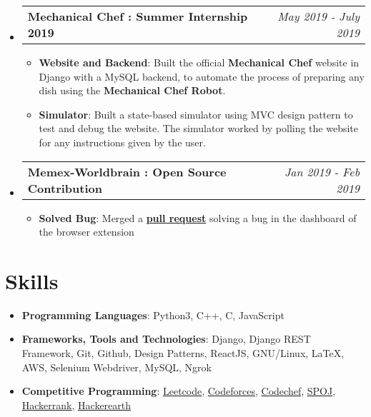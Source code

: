 \documentclass[a4paper,timesnewroman,11pt, twoside]{article}
\makeatletter
\numberwithin{equation}{section}
\newcommand{\resumeItem}[2]{
  \item\small{
    \textbf{#1}{: #2 \vspace{-5pt}}
  }
}
\newcommand{\resumeSubheadingk}[4]{
  \vspace{-3pt}\item
    \begin{tabular*}{0.97\textwidth}[t]{l@{\extracolsep{\fill}}r}
      \textbf{#1}  &\textit{#2} \\
    \end{tabular*}\vspace{-3.1pt}
}
\newcommand{\resumeSubHeadingListStart}{\begin{itemize}[leftmargin=*]}
\newcommand{\resumeSubHeadingListEnd}{\end{itemize}}
\newcommand{\resumeItemListStart}{\begin{itemize}}
\newcommand{\resumeItemListEnd}{\end{itemize}\vspace{-12pt}}
\makeatother
\begin{document}
\resumeSubHeadingListStart
    \resumeSubheadingk
      {Mechanical Chef : Summer Internship 2019}{May 2019 - July 2019}
      {}{}
      \resumeItemListStart
        \resumeItem{Website and Backend}
          {Built the official \textbf{Mechanical Chef} website in Django with a MySQL backend, to automate the process of preparing any dish using the \textbf{Mechanical Chef Robot}.}
        \resumeItem{Simulator}
          {Built a state-based simulator using MVC design pattern to test and debug the website. The simulator worked by polling the website for any instructions given by the user.}
      \resumeItemListEnd
  \resumeSubHeadingListEnd
  \resumeSubHeadingListStart
    \resumeSubheadingk
      {Memex-Worldbrain : Open Source Contribution}{Jan 2019 - Feb 2019}
      {}{}
      \resumeItemListStart
        \resumeItem{Solved Bug}
          {Merged a \href{https://github.com/WorldBrain/Memex/pull/693}{\textbf{pull request}} solving a bug in the dashboard of the browser extension}
      \resumeItemListEnd

  \resumeSubHeadingListEnd


\section{Skills}
 \resumeSubHeadingListStart
   \item{
     \textbf{Programming Languages}{: Python3, C++, C, JavaScript}
   }
   
   \item{
      \textbf{Frameworks, Tools and Technologies}{: Django, Django REST Framework, Git, Github, Design Patterns, ReactJS, GNU/Linux, LaTeX, AWS, Selenium Webdriver, MySQL, Ngrok}
   }
   \item{
      \textbf{Competitive Programming}{: \href{https://www.leetcode.com/saxenakartik}{Leetcode}, \href{http://codeforces.com/profile/krtksxn}{Codeforces}, \href{https://www.codechef.com/users/kartik_saxena}{Codechef}, \href{https://www.spoj.com/users/kartik_s/}{SPOJ}, \href{https://www.hackerrank.com/kartiksaxena500}{Hackerrank}, \href{https://www.hackerearth.com/@saxenakartik}{Hackerearth}}
      \hfill
   }
 \resumeSubHeadingListEnd
\end{document}
